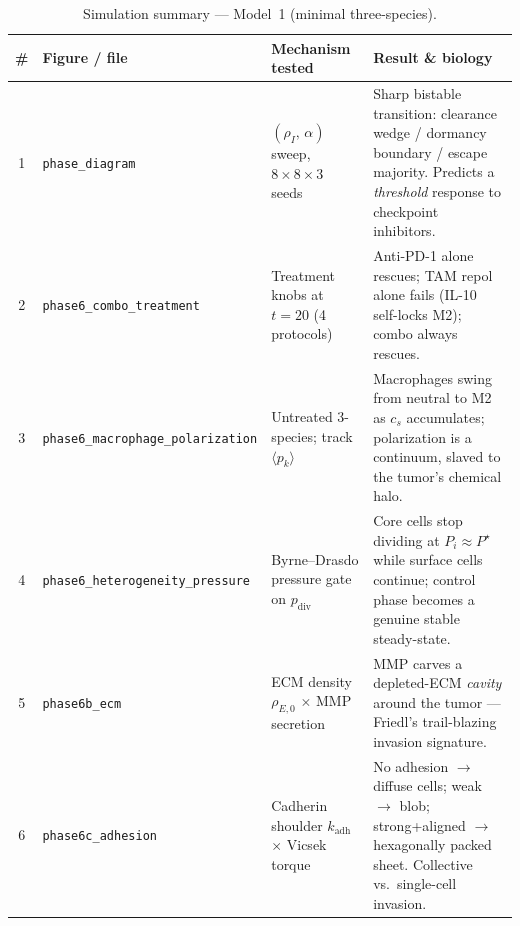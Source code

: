 
\begin{table}[h]
\centering\small
\caption{Simulation summary --- Model~1 (minimal three-species).}
\renewcommand{\arraystretch}{1.15}
\begin{tabularx}{\textwidth}{@{}c l X X@{}}
\toprule
\# & \textbf{Figure / file} & \textbf{Mechanism tested} & \textbf{Result \& biology} \\
\midrule
1 & \texttt{phase\_diagram} &
$(\rho_I,\,\alpha)$ sweep, $8\!\times\!8\!\times\!3$ seeds &
Sharp bistable transition: clearance wedge / dormancy boundary / escape majority. Predicts a \emph{threshold} response to checkpoint inhibitors. \\
2 & \texttt{phase6\_combo\_treatment} &
Treatment knobs at $t\!=\!20$ (4 protocols) &
Anti-PD-1 alone rescues; TAM repol alone fails (IL-10 self-locks M2); combo always rescues. \\
3 & \texttt{phase6\_macrophage\_polarization} &
Untreated 3-species; track $\langle p_k\rangle$ &
Macrophages swing from neutral to M2 as $c_s$ accumulates; polarization is a continuum, slaved to the tumor's chemical halo. \\
4 & \texttt{phase6\_heterogeneity\_pressure} &
Byrne--Drasdo pressure gate on $p_{\text{div}}$ &
Core cells stop dividing at $P_i\!\approx\!P^\star$ while surface cells continue; control phase becomes a genuine stable steady-state. \\
5 & \texttt{phase6b\_ecm} &
ECM density $\rho_{E,0}$ $\times$ MMP secretion &
MMP carves a depleted-ECM \emph{cavity} around the tumor --- Friedl's trail-blazing invasion signature. \\
6 & \texttt{phase6c\_adhesion} &
Cadherin shoulder $k_{\text{adh}}$ $\times$ Vicsek torque &
No adhesion $\to$ diffuse cells; weak $\to$ blob; strong+aligned $\to$ hexagonally packed sheet. Collective vs.\ single-cell invasion. \\
\bottomrule
\end{tabularx}
\label{tab:m1-summary}
\end{table}

\bigskip

